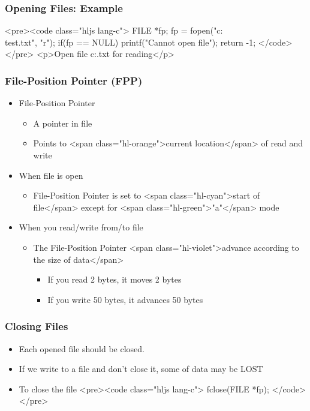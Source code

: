 \documentclass{../c-lecture}
\begin{document}
\begin{frame}
  \frametitle{Opening Files: Example}
  <pre><code class="hljs lang-c">
FILE *fp;
fp = fopen("c:\\test.txt", "r");
if(fp == NULL){
  printf("Cannot open file\n");
  return -1;
}
  </code></pre>
  <p>Open file c:\test.txt for reading</p>
\end{frame}
\begin{frame}
  \frametitle{File-Position Pointer (FPP)}
  \begin{itemize}
    \item File-Position Pointer
    \begin{itemize}
      \item A pointer in file
      \item
        Points to <span class="hl-orange">current location</span> of read and
        write

    \end{itemize}
    \item When file is open
    \begin{itemize}
      \item
        File-Position Pointer is set to
        <span class="hl-cyan">start of file</span> except for
        <span class="hl-green">"a"</span> mode

    \end{itemize}
    \item When you read/write from/to file
    \begin{itemize}
      \item
        The File-Position Pointer
        <span class="hl-violet">advance according to the size of data</span>

      \begin{itemize}
        \item If you read 2 bytes, it moves 2 bytes
        \item If you write 50 bytes, it advances 50 bytes
      \end{itemize}
    \end{itemize}
  \end{itemize}
\end{frame}
\begin{frame}
  \frametitle{Closing Files}
  \begin{itemize}
    \item Each opened file should be closed.
    \item If we write to a file and don’t close it, some of data may be LOST
    \item To close the file
    <pre><code class="hljs lang-c">
fclose(FILE *fp);
    </code></pre>
  \end{itemize}
\end{frame}
\end{document}
